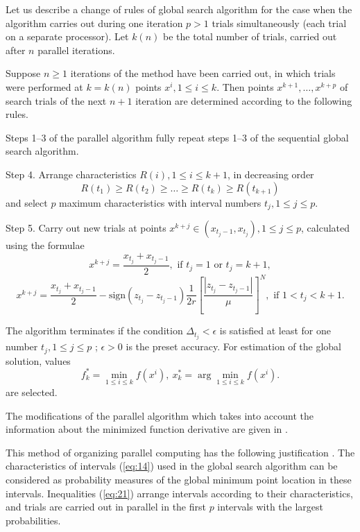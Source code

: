 \documentclass[smallcondensed]{svjour3}     %
\begin{document}
Let us describe a change of rules of global search algorithm for the case when the algorithm carries out during one iteration $p>1$ trials simultaneously (each trial on a separate processor). Let $k(n)$ be the total number of trials, carried out after $n$ parallel iterations.

Suppose $n\geq 1$  iterations of the method have been carried out, in which trials were performed at $k=k(n)$ points $x^i,1\leq i \leq k$. Then points $x^{k+1},\dots,x^{k+p}$  of search trials of the next $n+1$ iteration are determined according to the following rules.

Steps 1--3 of the parallel algorithm fully repeat steps 1--3 of the sequential global search algorithm.

Step 4. Arrange characteristics  $R(i), 1 \leq i \leq k+1$, in decreasing order 
\begin{equation}\label{eq:21}
R(t_1)\geq R(t_2)\geq \dots \geq R(t_{k}) \geq R(t_{k+1})
\end{equation}
and select $p$ maximum characteristics with interval numbers $t_j, 1\leq j \leq p$.

Step 5. Carry out new trials at points $x^{k+j}\in(x_{t_j-1},x_{t_j}), 1\leq j\leq p$, calculated using the formulae
\[
x^{k+j} = \frac{x_{t_j}+x_{t_j-1}}{2}, \textrm{ if } t_j=1 \textrm{ or } t_j=k+1,
\]
\[
x^{k+j} = \frac{x_{t_j}+x_{t_j-1}}{2} - \mathrm{sign}(z_{t_j}-z_{t_j-1})\frac{1}{2r}\left[\frac{\left|z_{t_j}-z_{t_j-1}\right|}{\mu}\right]^N, \textrm{ if } 1<t_j<k+1.
\]

The algorithm terminates if the condition $\Delta_{t_j}<\epsilon$ is satisfied at least for one number $t_j, 1 \leq j \leq p$ ; $\epsilon>0$ is the preset accuracy.  For estimation of the global solution, values
\[
f_k^\ast=\min_{1\leq i \leq k}f(x^i), \ x_k^\ast=\arg \min_{1\leq i \leq k}f(x^i).
\]
are selected.

The modifications of the parallel algorithm which takes into account the information about the minimized function derivative are given in \cite{RefGergel1999}.

This method of organizing parallel computing has the following justification \cite{RefStrongin2000,RefGrishagin1997}. The characteristics of intervals (\ref{eq:14}) used in the global search algorithm can be considered as probability measures of the global minimum point location in these intervals. Inequalities (\ref{eq:21}) arrange intervals according to their characteristics, and trials are carried out in parallel in the first $p$ intervals with the largest probabilities.
\end{document}
